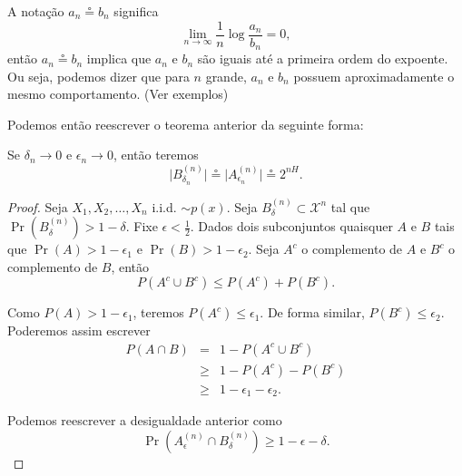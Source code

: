 \begin{frame}[allowframebreaks]
  \begin{definition}
  A notação $a_n \circeq b_n$ significa
        \begin{equation}
        \lim_{n \rightarrow \infty} \frac{1}{n} \log \frac{a_n}{b_n} = 0 ,
        \end{equation}
  então $a_n \circeq b_n$ implica que $a_n$ e $b_n$ são iguais até a primeira ordem do expoente.
  Ou seja, podemos dizer que para $n$ grande, $a_n$ e $b_n$ possuem aproximadamente o mesmo comportamento. 
  (Ver exemplos)
  \end{definition}
  Podemos então reescrever o teorema anterior da seguinte forma:
  \begin{theorem}
  Se $\delta_n \rightarrow 0$ e $\epsilon_n \rightarrow 0$, então teremos
        \begin{equation}
        \vert B_{\delta_n}^{(n)} \vert \circeq \vert A_{\epsilon_n}^{(n)} \vert \circeq 2^{nH}.
        \end{equation}
  \end{theorem}

  \framebreak

  \begin{proof}
  Seja $X_1, X_2, \ldots, X_n$ i.i.d. $\sim p(x)$. Seja $B_{\delta}^{(n)} \subset \mathcal{X}^n$ tal que
  $\Pr(B_{\delta}^{(n)}) > 1 - \delta$. Fixe $\epsilon < \frac{1}{2}$.
  Dados dois subconjuntos quaisquer $A$ e $B$ tais que $\Pr(A) > 1 - \epsilon_1$ e $\Pr(B) > 1 - \epsilon_2$.
  Seja $A^c$ o complemento de $A$ e $B^c$ o complemento de $B$, então
        \begin{equation}
        P(A^c \cup B^c) \leq P(A^c) + P(B^c) .
        \end{equation}

  \proofbreak

  Como $P(A) > 1 - \epsilon_1$, teremos $P(A^c) \leq \epsilon_1$. De forma similar, $P(B^c) \leq \epsilon_2$.
  Poderemos assim escrever
        \begin{eqnarray}
        P(A \cap B) &=& 1 - P(A^c \cup B^c) \nonumber \\
                &\geq& 1 - P(A^c) - P(B^c) \nonumber \\
                &\geq& 1 - \epsilon_1 - \epsilon_2.
        \end{eqnarray}

  Podemos reescrever a desigualdade anterior como
  \begin{equation}
  \Pr(A_{\epsilon}^{(n)} \cap B_{\delta}^{(n)}) \geq 1 - \epsilon - \delta .
  \end{equation}


\end{proof}
\end{frame}
